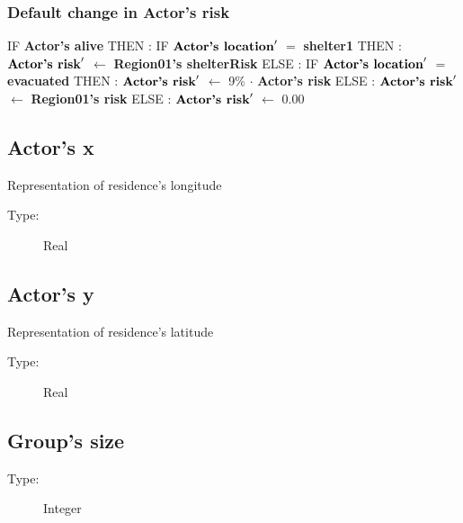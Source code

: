 \documentclass{article}%
\begin{document}
\subsubsection{Default change in Actor's risk}%
\label{ssubsec:Default change in Actor's risk}%
\begin{flushleft}%
IF %
\textbf{Actor's alive}%
\linebreak%
\hspace*{2em}%
THEN %
: %
IF %
$\mbox{\textbf{Actor's location}} '$%
$=$%
\textbf{shelter1}%
\linebreak%
\hspace*{4em}%
THEN %
: %
$\mbox{\textbf{Actor's risk}} '$%
$\leftarrow$%
\textbf{Region01's shelterRisk}%
\linebreak%
\hspace*{4em}%
ELSE %
: %
IF %
$\mbox{\textbf{Actor's location}} '$%
$=$%
\textbf{evacuated}%
\linebreak%
\hspace*{6em}%
THEN %
: %
$\mbox{\textbf{Actor's risk}} '$%
$\leftarrow$%
9\%%
$\cdot$%
\textbf{Actor's risk}%
\linebreak%
\hspace*{6em}%
ELSE %
: %
$\mbox{\textbf{Actor's risk}} '$%
$\leftarrow$%
\textbf{Region01's risk}%
\linebreak%
\hspace*{2em}%
ELSE %
: %
$\mbox{\textbf{Actor's risk}} '$%
$\leftarrow$%
0.00%
\end{flushleft}

%
\subsection{Actor's x}%
\label{subsec:Actor's x}%
Representation of residence's longitude%
\begin{description}%
\item[Type:]%
Real%
\end{description}

%
\subsection{Actor's y}%
\label{subsec:Actor's y}%
Representation of residence's latitude%
\begin{description}%
\item[Type:]%
Real%
\end{description}

%
\subsection{Group's size}%
\label{subsec:Group's size}%
\begin{description}%
\item[Type:]%
Integer%
\end{description}%
\end{document}

